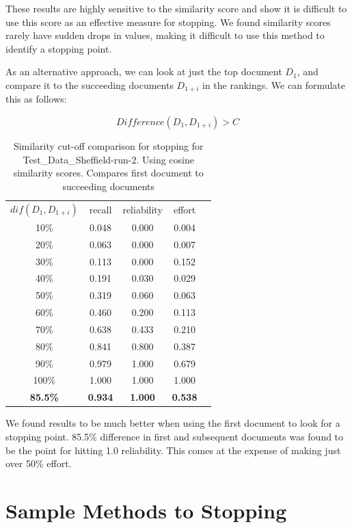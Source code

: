 These results are highly sensitive to the similarity score and show it is difficult to use this score as an effective measure for stopping. We found similarity scores rarely have sudden drops in values, making it difficult to use this method to identify a stopping point.

As an alternative approach, we can look at just the top document $D_1$, and compare it to the succeeding documents $D_{1+i}$ in the rankings. We can formulate this as follows:

\begin{equation}
	  Difference(D_1, D_{1 + i}) > C
\end{equation}

\begin{table}[H]
\centering
\begin{tabular}{|c|c|c|c|c|} 
\hline
 $dif(D_1, D_{1+i})$ & recall & reliability & effort  \\ 
 10\% & 0.048 &	0.000	&	0.004 \\ 
 20\% & 0.063 &	0.000	&	0.007 \\ 
 30\% & 0.113 &	0.000	&	0.152 \\ 
 40\% & 0.191 &	0.030	&	0.029 \\ 
 50\% & 0.319 &	0.060	&	0.063 \\
 60\% & 0.460 &	0.200	&	0.113 \\ 
 70\% & 0.638 &	0.433	&	0.210 \\ 
 80\% & 0.841 &	0.800	&	0.387 \\ 
 90\% & 0.979 &	1.000	&	0.679 \\ 
 100\% &1.000 &	1.000	&	1.000 \\  
 \textbf{85.5\%} & \textbf{0.934} &	\textbf{1.000}	&	\textbf{0.538} \\  
 \hline
\end{tabular}

\caption{Similarity cut-off comparison for stopping for Test\_Data\_Sheffield-run-2. Using cosine similarity scores. Compares first document to succeeding documents}
\end{table}

We found results to be much better when using the first document to look for a stopping point. 85.5\% difference in first and subsequent documents was found to be the point for hitting 1.0 reliability. This comes at the expense of making just over 50\% effort.

\section{Sample Methods to Stopping} \label{samplemethods}


